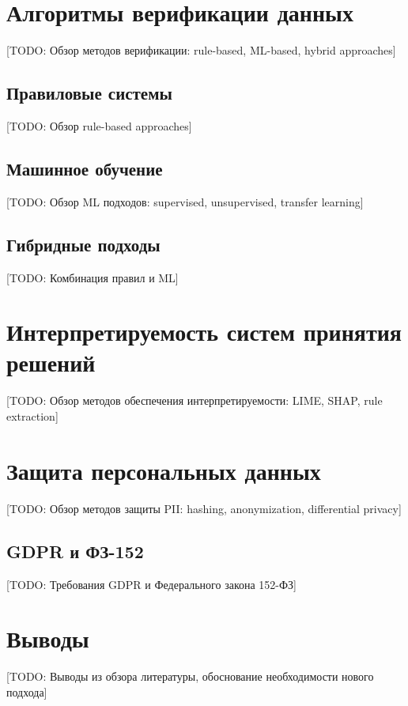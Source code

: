 \section{Алгоритмы верификации данных}
\label{sec:lit:verification}

[TODO: Обзор методов верификации: rule-based, ML-based, hybrid approaches]

\subsection{Правиловые системы}
\label{subsec:lit:rule_based}

[TODO: Обзор rule-based approaches]

\subsection{Машинное обучение}
\label{subsec:lit:ml}

[TODO: Обзор ML подходов: supervised, unsupervised, transfer learning]

\subsection{Гибридные подходы}
\label{subsec:lit:hybrid}

[TODO: Комбинация правил и ML]

\section{Интерпретируемость систем принятия решений}
\label{sec:lit:interpretability}

[TODO: Обзор методов обеспечения интерпретируемости: LIME, SHAP, rule extraction]

\section{Защита персональных данных}
\label{sec:lit:privacy}

[TODO: Обзор методов защиты PII: hashing, anonymization, differential privacy]

\subsection{GDPR и ФЗ-152}
\label{subsec:lit:gdpr}

[TODO: Требования GDPR и Федерального закона 152-ФЗ]

\section{Выводы}
\label{sec:lit:conclusions}

[TODO: Выводы из обзора литературы, обоснование необходимости нового подхода]
